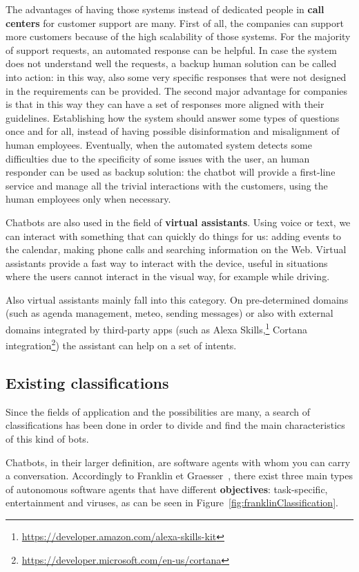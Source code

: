 The advantages of having those systems instead of dedicated people in \textbf{call centers} for customer support are many. First of all, the companies can support more customers because of the high scalability of those systems. For the majority of support requests, an automated response can be helpful. In case the system does not understand well the requests, a backup human solution can be called into action: in this way, also some very specific responses that were not designed in the requirements can be provided. The second major advantage for companies is that in this way they can have a set of responses more aligned with their guidelines. Establishing how the system should answer some types of questions once and for all, instead of having possible disinformation and misalignment of human employees. Eventually, when the automated system detects some difficulties due to the specificity of some issues with the user, an human responder can be used as backup solution: the chatbot will provide a first-line service and manage all the trivial interactions with the customers, using the human employees only when necessary.

Chatbots are also used in the field of \textbf{virtual assistants}. Using voice or text, we can interact with something that can quickly do things for us: adding events to the calendar, making phone calls and searching information on the Web. Virtual assistants provide a fast way to interact with the device, useful in situations where the users cannot interact in the visual way, for example while driving.

Also virtual assistants mainly fall into this category. On pre-determined domains (such as agenda management, meteo, sending messages) or also with external domains integrated by third-party apps (such as Alexa Skills,\footnote{\url{https://developer.amazon.com/alexa-skills-kit}} Cortana integration\footnote{\url{https://developer.microsoft.com/en-us/cortana}}) the assistant can help on a set of intents.

\subsection{Existing classifications}
\label{soaClassificationsExisting}

Since the fields of application and the possibilities are many, a search of classifications has been done in order to divide and find the main characteristics of this kind of bots.

Chatbots, in their larger definition, are software agents with whom you can carry a conversation. Accordingly to Franklin et Graesser~\cite{franklin1996agent}, there exist three main types of autonomous software agents that have different \textbf{objectives}: task-specific, entertainment and viruses, as can be seen in Figure~\ref{fig:franklinClassification}.

